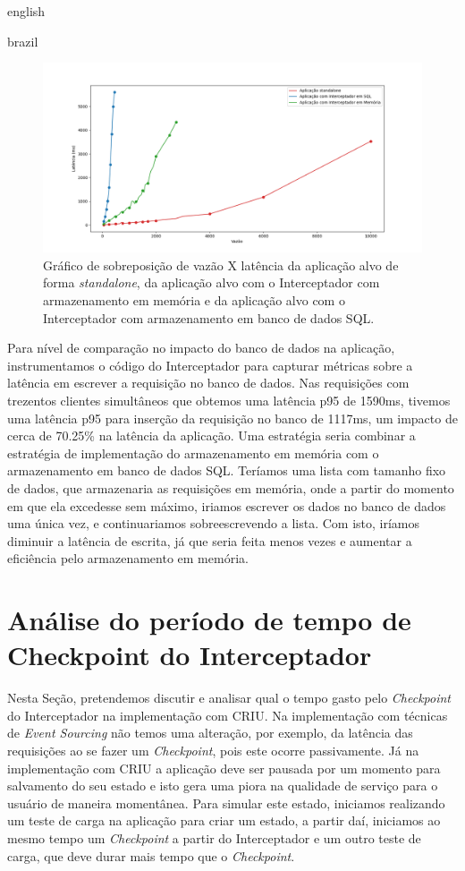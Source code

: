 \begin{otherlanguage*}{english}
\begin{otherlanguage*}{brazil}
\begin{figure}[h]
\centering
\includegraphics[scale=0.46]{images/vazaoxlatencia.png}
\caption{Gráfico de sobreposição de vazão X latência da aplicação alvo de forma \textit{standalone}, da aplicação alvo com o Interceptador com armazenamento em memória e da aplicação alvo com o Interceptador com armazenamento em banco de dados SQL.}
\label{fig:analysis-interceptor-standalone}
\end{figure}

Para nível de comparação no impacto do banco de dados na aplicação, instrumentamos o
código do Interceptador para capturar métricas sobre a latência em escrever a requisição
no banco de dados. Nas requisições com trezentos clientes simultâneos que obtemos uma
latência p95 de 1590ms, tivemos uma latência p95 para inserção da requisição no banco
de 1117ms, um impacto de cerca de 70.25\% na latência da aplicação. Uma estratégia seria combinar
a estratégia de implementação do armazenamento em memória com o armazenamento em banco de
dados SQL. Teríamos uma lista com tamanho fixo de dados, que armazenaria as requisições em
memória, onde a partir do momento em que ela excedesse sem máximo, iriamos escrever os dados no
banco de dados uma única vez, e continuariamos sobreescrevendo a lista. Com isto,
iríamos diminuir a latência de escrita, já que seria feita menos vezes e aumentar a
eficiência pelo armazenamento em memória.

\section{Análise do período de tempo de Checkpoint do Interceptador}

Nesta Seção, pretendemos discutir e analisar qual o tempo gasto pelo \textit{Checkpoint} do
Interceptador na implementação com CRIU. Na implementação com técnicas de
\textit{Event Sourcing} não temos uma alteração, por exemplo, da latência das requisições ao
se fazer um \textit{Checkpoint}, pois este ocorre passivamente. Já na implementação com CRIU
a aplicação deve ser pausada por um momento para salvamento do seu estado e isto gera uma
piora na qualidade de serviço para o usuário de maneira momentânea. Para simular este estado,
iniciamos realizando um teste de carga na aplicação para criar um estado, a partir daí, iniciamos
ao mesmo tempo um \textit{Checkpoint} a partir do Interceptador e um outro teste de carga, que deve
durar mais tempo que o \textit{Checkpoint}.


\end{otherlanguage*}
\end{otherlanguage*}
